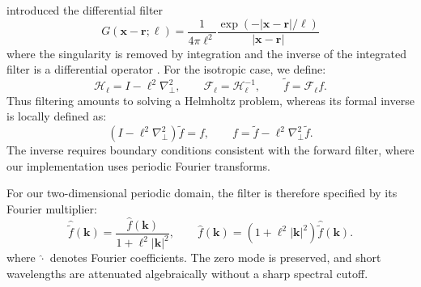 \documentclass[authoryear,preprint,review,12pt]{elsarticle}
\begin{document}
\citet{germano_differential_1986} introduced the differential filter
\begin{equation}
    G(\boldsymbol{x}-\boldsymbol{r};\ell) 
    = 
    \frac{1}{4\pi\ell^2} 
    \frac{\exp(-|\boldsymbol{x}-\boldsymbol{r}|/\ell)}{|\boldsymbol{x}-\boldsymbol{r}|}
\end{equation}
where the singularity is removed by integration and the inverse of the integrated filter is a differential operator \citep{germano_elliptic_1986}. For the isotropic case, we define:
\begin{equation}
    \mathcal{H}_\ell=I-\ell^2\nabla_\perp^2,
    \qquad \mathcal{F}_\ell=\mathcal{H}_\ell^{-1},
    \qquad \widetilde f=\mathcal{F}_\ell f.
    \label{eq:germano_filter}
\end{equation}
Thus filtering amounts to solving a Helmholtz problem, whereas its formal inverse is locally defined as:
\begin{equation}
    (I-\ell^2\nabla_\perp^2)\widetilde f=f,
    \qquad f=\widetilde f-\ell^2\nabla_\perp^2\widetilde f.
    \label{eq:germano_inverse}
\end{equation}
The inverse requires boundary conditions consistent with the forward filter, where our implementation uses periodic Fourier transforms.

For our two-dimensional periodic domain, the filter is therefore specified by its Fourier multiplier:
\begin{equation}
    \widehat{\widetilde{f}}(\mathbf{k})
    =\frac{\widehat f(\mathbf{k})}{1+\ell^2|\mathbf{k}|^2},
    \qquad
    \widehat f(\mathbf{k})
    =(1+\ell^2|\mathbf{k}|^2)\widehat{\widetilde{f}}(\mathbf{k}).
    \label{eq:germano_transfer}
\end{equation}
where $\widehat{\cdot}$ denotes Fourier coefficients. 
The zero mode is preserved, and short wavelengths are attenuated algebraically without a sharp spectral cutoff. 


\end{document}
